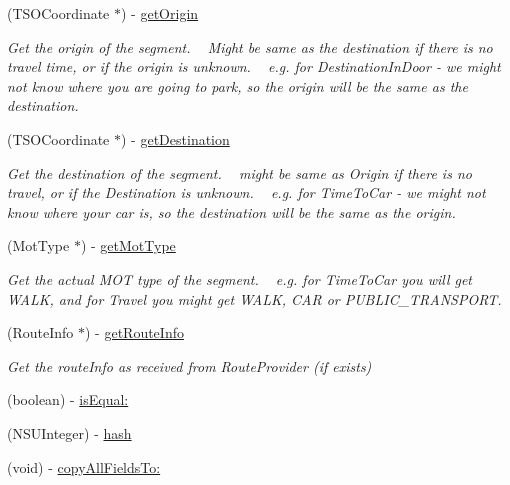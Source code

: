 \begin{DoxyCompactItemize}
(T\+S\+O\+Coordinate $\ast$) -\/ \hyperlink{interface_route_segment_ab2e79de5a98f48aa88a4435eac19f744}{get\+Origin}
\begin{DoxyCompactList}\small\item\em Get the origin of the segment. ~\newline
 Might be same as the destination if there is no travel time, or if the origin is unknown. ~\newline
 e.\+g. for Destination\+In\+Door -\/ we might not know where you are going to park, so the origin will be the same as the destination. \end{DoxyCompactList}\item 
(T\+S\+O\+Coordinate $\ast$) -\/ \hyperlink{interface_route_segment_a8d9608461c696b2f9d919f8ae4cbf780}{get\+Destination}
\begin{DoxyCompactList}\small\item\em Get the destination of the segment. ~\newline
 might be same as Origin if there is no travel, or if the Destination is unknown. ~\newline
 e.\+g. for Time\+To\+Car -\/ we might not know where your car is, so the destination will be the same as the origin. \end{DoxyCompactList}\item 
(Mot\+Type $\ast$) -\/ \hyperlink{interface_route_segment_ae81d8d39b90e1b4c9a5446a3f8dec1c7}{get\+Mot\+Type}
\begin{DoxyCompactList}\small\item\em Get the actual M\+O\+T type of the segment. ~\newline
 e.\+g. for Time\+To\+Car you will get W\+A\+L\+K, and for Travel you might get W\+A\+L\+K, C\+A\+R or P\+U\+B\+L\+I\+C\+\_\+\+T\+R\+A\+N\+S\+P\+O\+R\+T. \end{DoxyCompactList}\item 
(Route\+Info $\ast$) -\/ \hyperlink{interface_route_segment_a434aebe20fa72cbbb4401182455b0489}{get\+Route\+Info}
\begin{DoxyCompactList}\small\item\em Get the route\+Info as received from Route\+Provider (if exists) \end{DoxyCompactList}\item 
(boolean) -\/ \hyperlink{interface_route_segment_ad50edf8b160d570fd3534fe664efb3bd}{is\+Equal\+:}
\item 
(N\+S\+U\+Integer) -\/ \hyperlink{interface_route_segment_aeee8c6ace5147ac3e14dee485fc460c2}{hash}
\item 
(void) -\/ \hyperlink{interface_route_segment_ac133a788a7b0401f1b5dd2ad00e9ee3e}{copy\+All\+Fields\+To\+:}
\end{DoxyCompactItemize}
